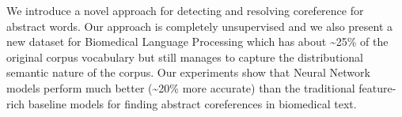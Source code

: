 We introduce a novel approach for detecting and resolving coreference for abstract words. Our approach is completely unsupervised and we also present a new dataset for Biomedical Language Processing which has about {\textasciitilde}25\% of the original corpus vocabulary but still manages to capture the distributional semantic nature of the corpus. Our experiments show that Neural Network models perform much better ({\textasciitilde}20\% more accurate) than the traditional feature-rich baseline models for finding abstract coreferences in biomedical text.
